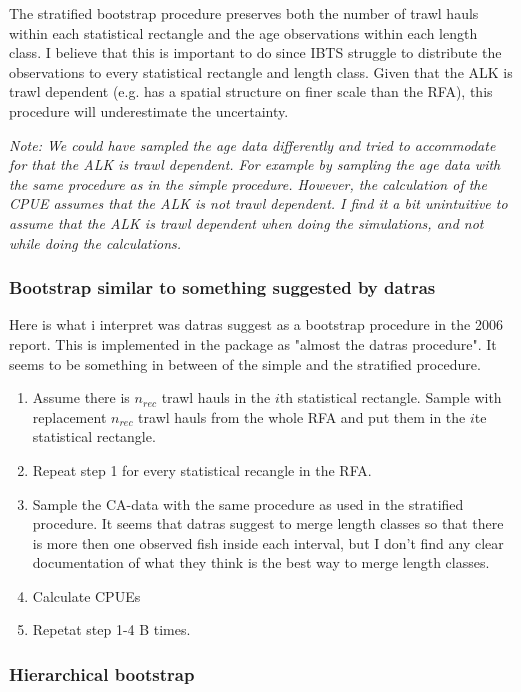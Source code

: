 \documentclass[a4paper 12pt]{article}
\numberwithin{equation}{section}
\begin{document}
The stratified bootstrap procedure preserves both the number of trawl hauls within each statistical rectangle and the age observations within each length class. I believe that this is important to do since IBTS struggle to distribute the observations to every statistical rectangle and length class. Given that the ALK is trawl dependent (e.g. has a spatial structure on finer scale than the RFA), this procedure will underestimate the uncertainty. 

\textit{Note: We could have sampled the age data differently and tried to accommodate for that the ALK is trawl dependent. For example by sampling the age data with the same procedure as in the simple procedure. However, the calculation of the CPUE assumes that the ALK is not trawl dependent. I find it a bit unintuitive to assume that the ALK is trawl dependent when doing the simulations, and not while doing the calculations. 
}

\subsubsection{Bootstrap similar to something suggested by datras}
\label{datrasboot}
Here is what i interpret was datras suggest as a bootstrap procedure in the 2006 report. This is implemented in the package as "almost the datras procedure". It seems to be something in between of the simple and the stratified procedure. 
\begin{enumerate}
\item  Assume there is $n_{rec}$ trawl hauls in the $i$th statistical rectangle. Sample with replacement $n_{rec}$ trawl hauls from the whole RFA and put them in the $i$te statistical rectangle.
\item Repeat step 1 for every statistical recangle in the RFA.
\item Sample the CA-data with the same procedure as used in the stratified procedure. It seems that datras suggest to merge length classes so that there is more then one observed fish inside each interval, but I don't find any clear documentation of what they think is the best way to merge length classes. 
\item Calculate CPUEs
\item Repetat step 1-4 B times.
\end{enumerate}

\subsubsection{Hierarchical bootstrap}
\label{hierarboot}
\end{document}
